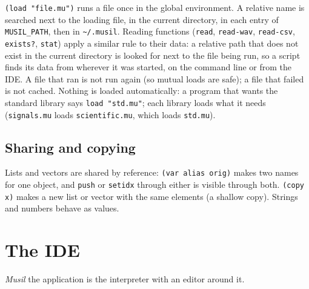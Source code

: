 \documentclass[11pt,a4paper]{article}
\newcommand{\musil}[1]{\lstinline[style=musilinline]{#1}}
\begin{document}
\musil{(load "file.mu")} runs a file once in the global environment. A relative name
is searched next to the loading file, in the current directory, in each entry of
\texttt{MUSIL\_PATH}, then in \texttt{\textasciitilde/.musil}. Reading functions
(\musil{read}, \musil{read-wav}, \musil{read-csv}, \musil{exists?}, \musil{stat})
apply a similar rule to their data: a relative path that does not exist in the current
directory is looked for next to the file being run, so a script finds its data from
wherever it was started, on the command line or from the IDE. A file that ran is not
run again (so mutual loads are safe); a file that failed is not cached. Nothing is
loaded automatically: a program that wants the standard library says
\musil{load "std.mu"}; each library loads what it needs (\musil{signals.mu} loads
\musil{scientific.mu}, which loads \musil{std.mu}).

\subsection{Sharing and copying}

Lists and vectors are shared by reference: \musil{(var alias orig)} makes two names
for one object, and \musil{push} or \musil{setidx} through either is visible through
both. \musil{(copy x)} makes a new list or vector with the same elements (a shallow
copy). Strings and numbers behave as values.

\section{The IDE}
\label{sec:ide}

\textit{Musil} the application is the interpreter with an editor around it.
\end{document}

